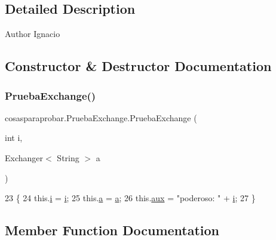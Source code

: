 \subsection{Detailed Description}
\begin{DoxyAuthor}{Author}
Ignacio 
\end{DoxyAuthor}


\subsection{Constructor \& Destructor Documentation}
\mbox{\label{classcosasparaprobar_1_1_prueba_exchange_ad9e7b50dfabee058757d9f2fb7ea83b1}} 
\subsubsection{\texorpdfstring{Prueba\+Exchange()}{PruebaExchange()}}
{\footnotesize\ttfamily cosasparaprobar.\+Prueba\+Exchange.\+Prueba\+Exchange (\begin{DoxyParamCaption}\item[{int}]{i,  }\item[{Exchanger$<$ String $>$}]{a }\end{DoxyParamCaption})\hspace{0.3cm}{\ttfamily [inline]}}


\begin{DoxyCode}
23     \{
24         this.\mbox{\hyperlink{classcosasparaprobar_1_1_prueba_exchange_ad45f6d758155fab2ad13a5f7b403c1b6}{i}} = \mbox{\hyperlink{classcosasparaprobar_1_1_prueba_exchange_ad45f6d758155fab2ad13a5f7b403c1b6}{i}};
25         this.\mbox{\hyperlink{classcosasparaprobar_1_1_prueba_exchange_a9c9b91539573982d12dc4f56a948e527}{a}} = \mbox{\hyperlink{classcosasparaprobar_1_1_prueba_exchange_a9c9b91539573982d12dc4f56a948e527}{a}};
26         this.\mbox{\hyperlink{classcosasparaprobar_1_1_prueba_exchange_a6b85e0f1bfaba3f17f162a97625b6e64}{aux}} = \textcolor{stringliteral}{"poderoso: "} + \mbox{\hyperlink{classcosasparaprobar_1_1_prueba_exchange_ad45f6d758155fab2ad13a5f7b403c1b6}{i}};
27     \}
\end{DoxyCode}


\subsection{Member Function Documentation}
\mbox{\label{classcosasparaprobar_1_1_prueba_exchange_a67dfba19ce6f5d55f46f066b45783311}} 
